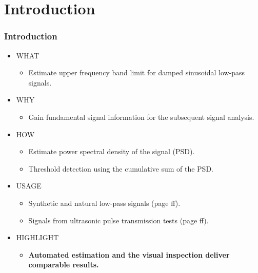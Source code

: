 \documentclass[11pt,aspectratio=169]{beamer}
\begin{document}
	\section{Introduction}
	\begin{frame}
		\frametitle{Introduction}
		\begin{itemize}
			\item \textcolor{RIPtitlecol}{WHAT}
			\begin{itemize}
				\item Estimate upper frequency band limit for damped sinusoidal low-pass signals.
			\end{itemize}
			\item \textcolor{RIPtitlecol}{WHY}
			\begin{itemize}
				\item Gain fundamental signal information for the subsequent signal analysis.
			\end{itemize}
			\item \textcolor{RIPtitlecol}{HOW}
			\begin{itemize}
				\item Estimate power spectral density of the signal (PSD).
				\item Threshold detection using the cumulative sum of the PSD.
			\end{itemize}
			\item \textcolor{RIPtitlecol}{USAGE}
			\begin{itemize}
				\item Synthetic and natural low-pass signals (page \pageref{res:synthetic} ff).
				\item Signals from ultrasonic pulse transmission tests (page \pageref{res:natural} ff).
			\end{itemize}
			\item \textcolor{RIPtitlecol}{HIGHLIGHT}
			\begin{itemize}
				\item \textbf{Automated estimation and the visual inspection deliver comparable results.}
			\end{itemize}
		\end{itemize}
	\end{frame}
\end{document}
